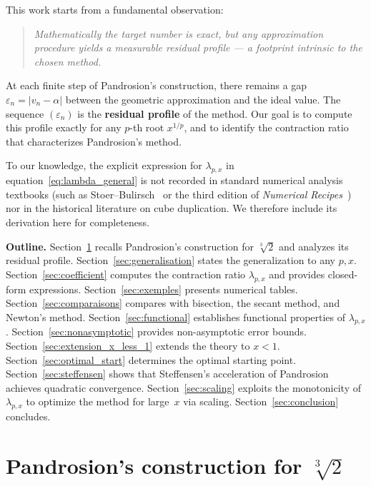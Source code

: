 \documentclass[11pt,a4paper]{article}
\theoremstyle{definition}
\newcommand{\cbrt}[1]{\sqrt[3]{#1}}
\newcommand{\eps}{\varepsilon}
\begin{document}
\medskip

This work starts from a fundamental observation:

\begin{quote}
\itshape Mathematically the target number is exact, but any approximation procedure yields a measurable residual profile --- a footprint intrinsic to the chosen method.
\end{quote}

At each finite step of Pandrosion's construction, there remains a gap $\eps_n = |v_n - \alpha|$ between the geometric approximation and the ideal value. The sequence $(\eps_n)$ is the \textbf{residual profile} of the method. Our goal is to compute this profile exactly for any $p$-th root $x^{1/p}$, and to identify the contraction ratio that characterizes Pandrosion's method.

\medskip

To our knowledge, the explicit expression for $\lambda_{p,x}$ in equation~\eqref{eq:lambda_general} is not recorded in standard numerical analysis textbooks (such as Stoer--Bulirsch~\cite{stoer} or the third edition of \emph{Numerical Recipes}~\cite{numrecipes}) nor in the historical literature on cube duplication.  We therefore include its derivation here for completeness.

\medskip

\textbf{Outline.} Section~\ref{sec:pandrosion3} recalls Pandrosion's construction for $\cbrt{2}$ and analyzes its residual profile. Section~\ref{sec:generalisation} states the generalization to any $p, x$. Section~\ref{sec:coefficient} computes the contraction ratio $\lambda_{p,x}$ and provides closed-form expressions. Section~\ref{sec:exemples} presents numerical tables. Section~\ref{sec:comparaisons} compares with bisection, the secant method, and Newton's method. Section~\ref{sec:functional} establishes functional properties of $\lambda_{p,x}$. Section~\ref{sec:nonasymptotic} provides non-asymptotic error bounds. Section~\ref{sec:extension_x_less_1} extends the theory to $x < 1$. Section~\ref{sec:optimal_start} determines the optimal starting point. Section~\ref{sec:steffensen} shows that Steffensen's acceleration of Pandrosion achieves quadratic convergence. Section~\ref{sec:scaling} exploits the monotonicity of $\lambda_{p,x}$ to optimize the method for large~$x$ via scaling. Section~\ref{sec:conclusion} concludes.

\section{Pandrosion's construction for \texorpdfstring{$\cbrt{2}$}{cbrt(2)}}
\label{sec:pandrosion3}
\end{document}
